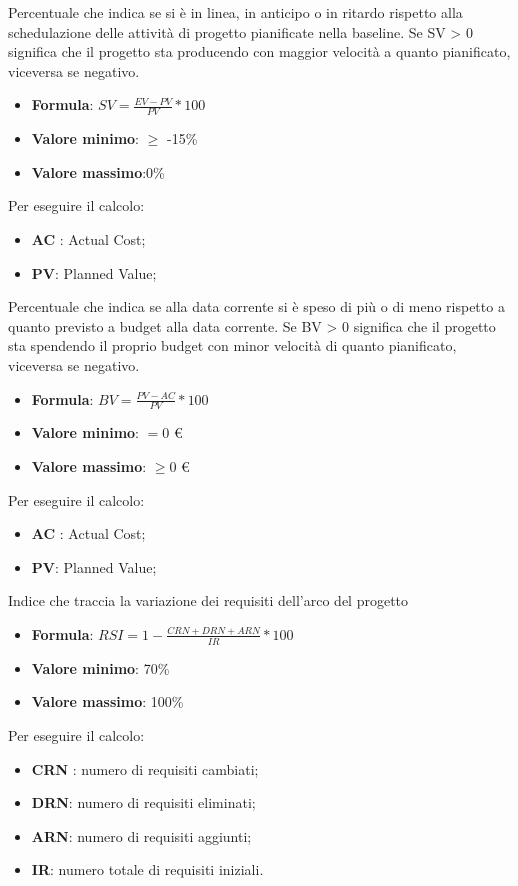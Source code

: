 Percentuale che indica se si è in linea, in anticipo o in ritardo rispetto alla schedulazione delle attività di progetto pianificate nella baseline. 
Se SV > 0 significa che il progetto sta producendo con maggior velocità a quanto pianificato, viceversa se negativo. 
\begin{itemize}
    \item \textbf{Formula}: $SV=\frac{EV-PV}{PV}*100$
    \item \textbf{Valore minimo}: $\geq$ -15\%
    \item \textbf{Valore massimo}:0\%
\end{itemize}  
Per eseguire il calcolo:
\begin{itemize}
    \item \textbf{AC} : Actual Cost;
    \item \textbf{PV}: Planned Value;
\end{itemize}

Percentuale che indica se alla data corrente si è speso di più o di meno rispetto a quanto previsto a budget alla data corrente. 
Se BV > 0 significa che il progetto sta spendendo il proprio budget con minor velocità di quanto pianificato, viceversa se negativo.
\begin{itemize}
    \item \textbf{Formula}: $BV=\frac{PV-AC}{PV}*100$
    \item \textbf{Valore minimo}: $=0$ \euro
    \item \textbf{Valore massimo}: $\geq0$ \euro
\end{itemize}  
Per eseguire il calcolo:
\begin{itemize}
    \item \textbf{AC} : Actual Cost;
    \item \textbf{PV}: Planned Value;
\end{itemize}

Indice che traccia la variazione dei requisiti dell'arco del progetto
\begin{itemize}
    \item \textbf{Formula}: $RSI = 1 - \frac{CRN+DRN+ARN}{IR}*100$
    \item \textbf{Valore minimo}: 70\%
    \item \textbf{Valore massimo}: 100\%
\end{itemize}  
Per eseguire il calcolo:
\begin{itemize}
    \item \textbf{CRN} : numero di requisiti cambiati;
    \item \textbf{DRN}: numero di requisiti eliminati;
    \item \textbf{ARN}: numero di requisiti aggiunti;
    \item \textbf{IR}: numero totale di requisiti iniziali.
\end{itemize}

